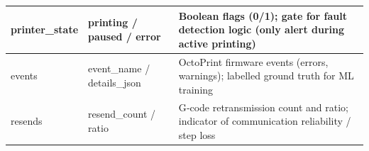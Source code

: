 \begin{xltabular}{\linewidth}{| L{2.5cm} | L{2.5cm} | X |}
printer\_state & printing / paused / error & Boolean flags (0/1); gate for fault detection logic (only alert during active printing) \\
\hline

events & event\_name / details\_json & OctoPrint firmware events (errors, warnings); labelled ground truth for ML training \\
\hline

resends & resend\_count / ratio & G‑code retransmission count and ratio; indicator of communication reliability / step loss \\
\hline

\end{xltabular}